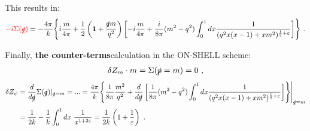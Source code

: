 \documentclass[a4paper,11pt,DIV=12]{scrartcl}
\begin{document}
This results in: 
\begin{align*}
    \textcolor{red} {-i \Sigma(\slashed{q})}= -\frac{4 \pi}{k}\Biggl\{ i\frac{m}{4\pi} + \frac{1}{2} \left(\mathbf{1}+\frac{\slashed{q}m}{q^2}\right) \left[ -i\frac{m}{4 \pi} + \frac{i}{8 \pi} (m^2 - q^2)\int_0^1 dx \frac{1}{(q^2 x(x-1)+xm^2)^{\frac{1}{2}+\varepsilon}}  \right] \Biggr\}\ .
\end{align*}


Finally, \textbf{the counter-terms}calculation in the ON-SHELL scheme:
\begin{align*}
    \delta Z_m \cdot m = \Sigma(\slashed{p}=m) = 0\ ,
\end{align*}
\begin{align*}
    \delta Z_\psi &= \frac{d}{d \slashed{q}}\Sigma(\slashed{q})|_{\slashed{q}=m} =...=\frac{4 \pi}{k}\Biggl\{ \frac{1}{8\pi}\frac{m^2}{q^2} + \frac{d}{d\slashed{q}}\left[ \frac{1}{8 \pi} (m^2-q^2) \int_0^1 dx \frac{1}{(q^2 x (x-1)+xm^2)^{\frac{1}{2}+\varepsilon}}  \right]  \Biggr\}\Bigg| _{\slashed{q}=m}
    \\ &=\frac{1}{2k} -\frac{1}{k} \int_0^1 dx\  \frac{1}{x^{1+2\varepsilon}}=\frac{1}{2k}\left(1+\frac{1}{\varepsilon}\right)\ .
\end{align*}


% 
% 
\end{document}
